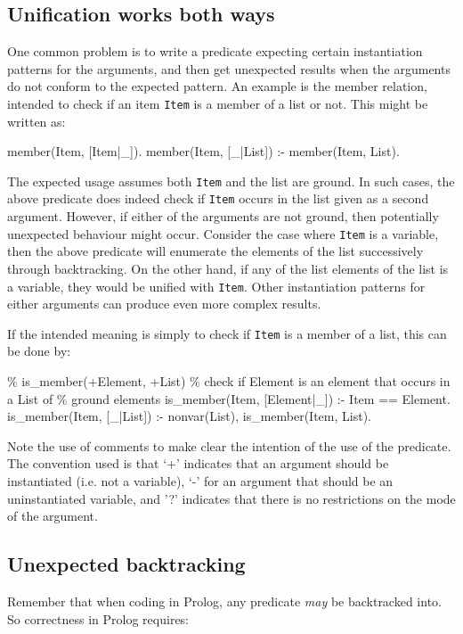     \subsection{Unification works both ways}
\label{unif}
One common problem is to write a predicate expecting certain instantiation
patterns for the arguments, and then get unexpected results when the 
arguments do not conform to the expected pattern. An example is the
member relation, intended to check if an item \verb'Item' is a member of
a list or not. This might be written as:


\begin{code}
member(Item, [Item|_]).
member(Item, [_|List]) :- member(Item, List).
\end{code}

The expected usage assumes both \verb'Item' and the list are ground. In 
such cases, the above predicate does indeed check if \verb'Item' occurs in
the list given as a second argument. However, if either of the arguments are
not ground, then potentially unexpected behaviour might occur. Consider
the case where \verb'Item' is a variable, then the above predicate will 
enumerate the elements of the list successively through backtracking. On
the other hand, if any of the list elements of the list is a variable, they
would be unified with \verb'Item'. Other instantiation patterns for either
arguments can produce even more complex results. 

If the intended meaning is simply to check if \verb'Item' is a member of 
a list, this can be done by:

\begin{code}
  \% is_member(+Element, +List)
  \% check if Element is an element that occurs in a List of
  \% ground elements
is_member(Item, [Element|_]) :- Item == Element.
is_member(Item, [_|List]) :- nonvar(List), is_member(Item, List).
\end{code}

Note the use of comments to make clear the intention of the use of the
predicate. The convention used is that `+' indicates that an argument should
be instantiated (i.e. not a variable), `-' for an argument that should be
an uninstantiated variable, and '?' indicates that there is no restrictions
on the mode of the argument.

    \subsection{Unexpected backtracking}
\label{back}
Remember that when coding in Prolog, any predicate {\it may\/} be backtracked 
into. So correctness in Prolog requires:


